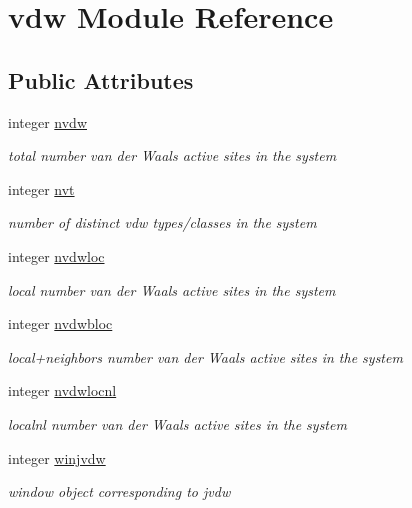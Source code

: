 \hypertarget{classvdw}{\section{vdw Module Reference}
\label{classvdw}
}
\subsection*{Public Attributes}
\begin{DoxyCompactItemize}
\item 
integer \hyperlink{classvdw_ab188e58125273df95e334decf7db12f3}{nvdw}
\begin{DoxyCompactList}\small\item\em total number van der Waals active sites in the system \end{DoxyCompactList}\item 
integer \hyperlink{classvdw_a6d9a7d303d6bab7238b14f89965de887}{nvt}
\begin{DoxyCompactList}\small\item\em number of distinct vdw types/classes in the system \end{DoxyCompactList}\item 
integer \hyperlink{classvdw_a53b9f8a5df5936b34ec6e5eef165f7d8}{nvdwloc}
\begin{DoxyCompactList}\small\item\em local number van der Waals active sites in the system \end{DoxyCompactList}\item 
integer \hyperlink{classvdw_ade4cf6b2078920c6220e9dbe93fc597c}{nvdwbloc}
\begin{DoxyCompactList}\small\item\em local+neighbors number van der Waals active sites in the system \end{DoxyCompactList}\item 
integer \hyperlink{classvdw_ad9fb8b87e6260d7940ff961e4014ccda}{nvdwlocnl}
\begin{DoxyCompactList}\small\item\em localnl number van der Waals active sites in the system \end{DoxyCompactList}\item 
integer \hyperlink{classvdw_af57e0531d67b1526fbcff2a6873c9667}{winjvdw}
\begin{DoxyCompactList}\small\item\em window object corresponding to jvdw \end{DoxyCompactList}\item 

\end{DoxyCompactItemize}
